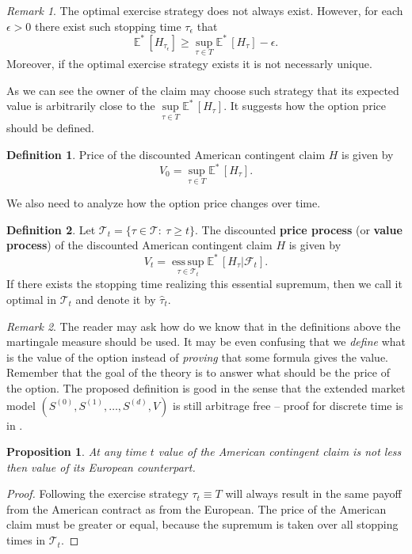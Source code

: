 \documentclass[a4paper,12pt, oneside]{book}
\newtheorem{prop}[thm]{Proposition}
\theoremstyle{definition}
\newtheorem{mydef}{Definition}[chapter]
\theoremstyle{remark}
\newtheorem{remark}{Remark}[chapter]
\def\Em{{\mathbb{E}^*}\,}
\DeclareMathOperator*{\esssup}{ess\,sup}
\begin{document}
\begin{remark}
 The optimal exercise strategy does not always exist. However, for each $\epsilon > 0$ there exist such stopping time $\tau_\epsilon$ that
 \[ \Em[H_{\tau_\epsilon}] \geq \sup\limits_{\tau \in T} \Em[H_{\tau}] - \epsilon.\]
 Moreover, if the optimal exercise strategy exists it is not necessarly unique.
\end{remark}
As we can see the owner of the claim may choose such strategy that its expected value is arbitrarily close to the $\sup\limits_{\tau \in T} \Em[H_{\tau}]$. It suggests how the option price should be defined.
\begin{mydef}
 Price of the discounted American contingent claim $H$ is given by
\begin{equation}
\label{eq:AM_optPrice}
V_0 = \sup\limits_{\tau \in T} \Em[H_{\tau}]. 
\end{equation}
\end{mydef}
We also need to analyze how the option price changes over time.
\begin{mydef}
 \label{def:valueProcess}
 Let  $\mathcal{T}_t = \{ \tau \in \mathcal{T}:\ \tau \geq t \}$. The discounted \textbf{price process} (or \textbf{value process}) of the  discounted American contingent claim $H$ is given by
\begin{equation}
\label{eq:AM_valueProcess}
V_t = \esssup\limits_{\tau \in  \mathcal{T}_t} \Em[H_{\tau} | \mathcal{F}_t]. 
\end{equation}
 If there exists the stopping time realizing this essential supremum, then we call it optimal in $\mathcal{T}_t$ and denote it by $\hat{\tau}_t$.
\end{mydef}

\begin{remark}
 The reader may ask how do we know that in the definitions above the martingale measure should be used. It may be even confusing that we \emph{define} what is the value of the option instead of \emph{proving} that some formula gives the value. Remember that the goal of the theory is to answer what should be the price of the option. The proposed definition is good in the sense that the extended market model $(S^{(0)}, S^{(1)}, \ldots, S^{(d)}, V)$ is still arbitrage free -- proof for discrete time is in \cite{follmer}.
\end{remark}


\begin{prop}
 At any time $t$ value of the American contingent claim is not less then value of its European counterpart.
\end{prop}
\begin{proof}
 Following the exercise strategy $\tau_t \equiv T$ will always result in the same payoff from the American contract as from the European. The price of the American claim must be greater or equal, because the supremum is taken over all stopping times in $\mathcal{T}_t$.
\end{proof}
\end{document}
